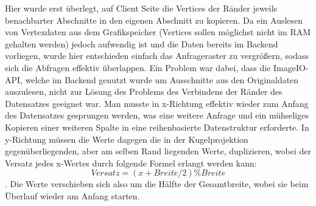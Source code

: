 Hier wurde erst überlegt, auf Client Seite die Vertices der Ränder jeweils benachbarter Abschnitte in den eigenen Abschnitt zu kopieren. Da ein Auslesen von Vertexdaten aus dem Grafikspeicher (Vertices sollen möglichst nicht im RAM gehalten werden) jedoch aufwendig ist und die Daten bereits im Backend vorliegen, wurde hier entschieden einfach das Anfrageraster zu vergrößern, sodass sich die Abfragen effektiv überlappen. Ein Problem war dabei, dass die ImageIO-API, welche im Backend genutzt wurde um Ausschnitte aus den Originaldaten auszulesen, nicht zur Lösung des Problems des Verbindens der Ränder des Datensatzes geeignet war. Man musste in x-Richtung effektiv wieder zum Anfang des Datensatzes gesprungen werden, was eine weitere Anfrage und ein mühseliges Kopieren einer weiteren Spalte in eine reihenbasierte Datenstruktur erforderte. In y-Richtung müssen die Werte dagegen die in der Kugelprojektion gegenüberliegenden, aber am selben Rand liegenden Werte, duplizieren, wobei der Versatz jedes x-Wertes durch folgende Formel erlangt werden kann: \[Versatz = (x + Breite / 2) \% Breite\]. Die Werte verschieben sich also um die Hälfte der Gesamtbreite, wobei sie beim Überlauf wieder am Anfang starten.

